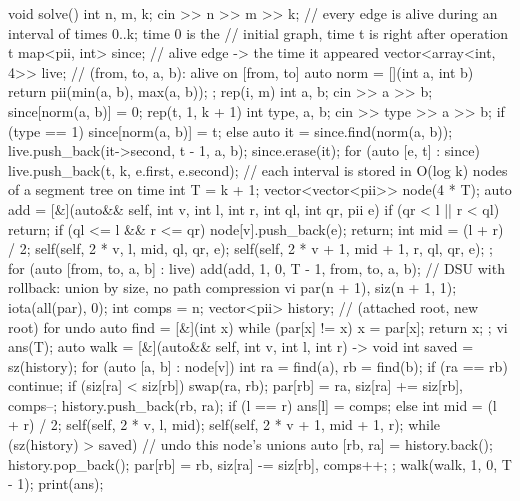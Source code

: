 \begin{code}
void solve() {
    int n, m, k;
    cin >> n >> m >> k;
    // every edge is alive during an interval of times 0..k; time 0 is the
    // initial graph, time t is right after operation t
    map<pii, int> since;  // alive edge -> the time it appeared
    vector<array<int, 4>> live;  // (from, to, a, b): alive on [from, to]
    auto norm = [](int a, int b) { return pii(min(a, b), max(a, b)); };
    rep(i, m) {
        int a, b;
        cin >> a >> b;
        since[norm(a, b)] = 0;
    }
    rep(t, 1, k + 1) {
        int type, a, b;
        cin >> type >> a >> b;
        if (type == 1) since[norm(a, b)] = t;
        else {
            auto it = since.find(norm(a, b));
            live.push_back({it->second, t - 1, a, b});
            since.erase(it);
        }
    }
    for (auto [e, t] : since) live.push_back({t, k, e.first, e.second});
    // each interval is stored in O(log k) nodes of a segment tree on time
    int T = k + 1;
    vector<vector<pii>> node(4 * T);
    auto add = [&](auto&& self, int v, int l, int r, int ql, int qr, pii e) {
        if (qr < l || r < ql) return;
        if (ql <= l && r <= qr) {
            node[v].push_back(e);
            return;
        }
        int mid = (l + r) / 2;
        self(self, 2 * v, l, mid, ql, qr, e);
        self(self, 2 * v + 1, mid + 1, r, ql, qr, e);
    };
    for (auto [from, to, a, b] : live) add(add, 1, 0, T - 1, from, to, {a, b});
    // DSU with rollback: union by size, no path compression
    vi par(n + 1), siz(n + 1, 1);
    iota(all(par), 0);
    int comps = n;
    vector<pii> history;  // (attached root, new root) for undo
    auto find = [&](int x) {
        while (par[x] != x) x = par[x];
        return x;
    };
    vi ans(T);
    auto walk = [&](auto&& self, int v, int l, int r) -> void {
        int saved = sz(history);
        for (auto [a, b] : node[v]) {
            int ra = find(a), rb = find(b);
            if (ra == rb) continue;
            if (siz[ra] < siz[rb]) swap(ra, rb);
            par[rb] = ra, siz[ra] += siz[rb], comps--;
            history.push_back({rb, ra});
        }
        if (l == r) ans[l] = comps;
        else {
            int mid = (l + r) / 2;
            self(self, 2 * v, l, mid);
            self(self, 2 * v + 1, mid + 1, r);
        }
        while (sz(history) > saved) {  // undo this node's unions
            auto [rb, ra] = history.back();
            history.pop_back();
            par[rb] = rb, siz[ra] -= siz[rb], comps++;
        }
    };
    walk(walk, 1, 0, T - 1);
    print(ans);
}
\end{code}

